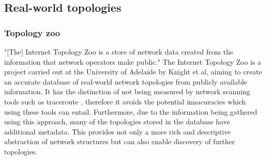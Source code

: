 \subsection{Real-world topologies}
\subsubsection{Topology zoo}
"[The] Internet Topology Zoo is a store of network
data created from the information that network operators make
public." \cite{topology_zoo} The Internet Topology Zoo is a project carried out at the University of Adelaide by Knight et al, aiming to create an accurate database of real-world network topologies from publicly available information. It has the distinction of not being measured by network scanning tools such as traceroute \cite{jacobson1989traceroute}, therefore it avoids the potential innacuracies which using these tools can entail. Furthermore, due to the information being gathered using this approach, many of the topologies stored in the database have additional metadata. This provides not only a more rich and descriptive abstraction of network structures but can also enable discovery of further topologies. 

